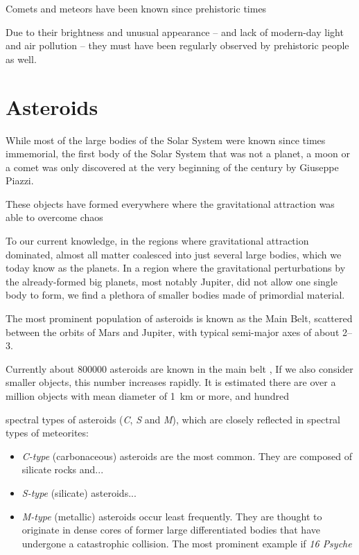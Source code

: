 Comets and meteors have been known since prehistoric times

Due to their brightness and unusual appearance -- and lack of modern-day light and air pollution -- they
must have been regularly observed by prehistoric people as well.



\section{Asteroids} \label{aa}
    While most of the large bodies of the Solar System were known since times immemorial,
    the first body of the Solar System that was not a planet, a moon or a comet was only discovered at
    the very beginning of the  century by Giuseppe Piazzi.

    These objects have formed everywhere where the gravitational attraction was able to overcome chaos \citep{???}

    To our current knowledge, in the regions where gravitational attraction dominated, almost all matter
    coalesced into just several large bodies, which we today know as the planets.
    In a region where the gravitational perturbations by the already-formed big planets, most notably Jupiter,
    did not allow one single body to form, we find a plethora of smaller bodies made of primordial material.

    The most prominent population of asteroids is known as the Main Belt, scattered between the orbits
    of Mars and Jupiter, with typical semi-major axes of about \SIrange{2}{3}{\au}.

    Currently about \num{800000} asteroids are known in the main belt ,
    If we also consider smaller objects, this number increases rapidly.
    It is estimated \citep{???} there are over a million objects with mean diameter of \SI{1}{\kilo\metre} or more,
    and hundred

    spectral types of asteroids (\emph{C}, \emph{S} and \emph{M}), which are closely reflected in
    spectral types of meteorites:

    \begin{itemize}
        \item \emph{C-type} (carbonaceous) asteroids are the most common. They are composed of silicate rocks and... 
        \item \emph{S-type} (silicate) asteroids... 
        \item \emph{M-type} (metallic) asteroids occur least frequently.
            They are thought to originate in dense cores of former large differentiated bodies that have
            undergone a catastrophic collision.
            The most prominent example if \emph{16 Psyche}
    \end{itemize}


